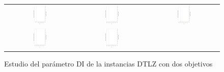 %
\begin{figure}[h]
\centering
\caption{Estudio del parámetro DI de la instancias DTLZ con dos objetivos}
\label{fig:Scalability_Study_HV_1}
\begin{tabular}{ccc}
   \includegraphics[width=0.2\textwidth, angle=-90,origin=c]{Figures_Chapter7/Results_Chapter3/EPS_DI/2obj_DTLZ1.eps} &
   \includegraphics[width=0.2\textwidth, angle=-90,origin=c]{Figures_Chapter7/Results_Chapter3/EPS_DI/2obj_DTLZ2.eps} &
   \includegraphics[width=0.2\textwidth,angle=-90,origin=c]{Figures_Chapter7/Results_Chapter3/EPS_DI/2obj_DTLZ3.eps}  
    \\ 
   \includegraphics[width=0.2\textwidth, angle=-90,origin=c]{Figures_Chapter7/Results_Chapter3/EPS_DI/2obj_DTLZ4.eps} &
   \includegraphics[width=0.2\textwidth, angle=-90,origin=c]{Figures_Chapter7/Results_Chapter3/EPS_DI/2obj_DTLZ5.eps} &

\end{tabular}
\end{figure}
